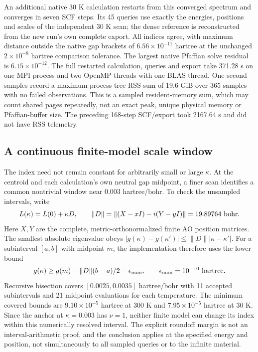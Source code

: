 \documentclass[11pt]{article}
\begin{document}
An additional native 30 K calculation restarts from this converged
spectrum and converges in seven SCF steps. Its 45 queries use exactly
the energies, positions and scales of the independent 30 K scan;
the dense reference is reconstructed from the new run's own complete
export. All indices agree, with maximum distance outside the native
gap brackets of $6.56\times10^{-11}$ hartree at the unchanged
$2\times10^{-8}$ hartree comparison tolerance. The largest native
Pfaffian solve residual is $6.15\times10^{-12}$. The full restarted
calculation, queries and export take 371.28 s on one MPI process
and two OpenMP threads with one BLAS thread. One-second samples
record a maximum process-tree RSS sum of 19.6 GiB over 365 samples
with no failed observations. This is a sampled resident-memory
sum, which may count shared pages repeatedly, not an exact peak,
unique physical memory or Pfaffian-buffer size. The preceding
168-step SCF/export took 2167.64 s and did not have RSS telemetry.

\subsection{A continuous finite-model scale window}
The index need not remain constant for arbitrarily small or large
$\kappa$. At the centroid and each calculation's own neutral gap
midpoint, a finer scan identifies a common nontrivial window near
$0.003$ hartree/bohr. To check the unsampled intervals, write
\begin{equation}
 L(\kappa)=L(0)+\kappa D,\qquad
 \|D\|=\|(X-xI)-i(Y-yI)\|=19.89764\ {\rm bohr}.
\end{equation}
Here $X,Y$ are the complete, metric-orthonormalized finite AO
position matrices. The smallest absolute eigenvalue obeys
$|g(\kappa)-g(\kappa')|\leq\|D\||\kappa-\kappa'|$.
For a subinterval $[a,b]$ with midpoint $m$, the implementation
therefore uses the lower bound
\begin{equation}
 g(\kappa)\geq g(m)-\|D\|(b-a)/2-\epsilon_{\rm num},
 \qquad \epsilon_{\rm num}=10^{-10}\ {\rm hartree}.
\end{equation}
Recursive bisection covers
$[0.0025,0.0035]$ hartree/bohr with 11 accepted subintervals
and 21 midpoint evaluations for each temperature. The minimum
covered bounds are $9.10\times10^{-5}$ hartree at 300 K and
$7.95\times10^{-5}$ hartree at 30 K. Since the anchor at
$\kappa=0.003$ has $\nu=1$, neither finite model can change
its index within this numerically resolved interval. The explicit
roundoff margin is not an interval-arithmetic proof, and the
conclusion applies at the specified energy and position, not
simultaneously to all sampled queries or to the infinite material.
\end{document}
